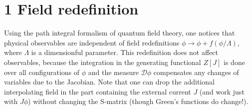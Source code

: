 \documentclass[prd,%
,superscriptaddress,%
nofootinbib,%
tightenlines ]{revtex4}
\begin{document}
\section*{1 Field redefinition \hspace{-2cm}} 
\noindent
Using the path integral formalism of quantum field theory, one notices that physical observables are independent of field redefinitions 
$\phi\rightarrow\phi+f(\phi/\Lambda)$, where $\Lambda$ is a dimensionful parameter. This redefinition does not affect observables, because the integration in the generating functional $Z[J]$ is done over all configurations of $\phi$ and the measure $\mathcal{D}\phi$ compensates any changes of variables due to the Jacobian.  Note that one can drop the additional interpolating field in the part containing the external current $J$ (and work just with $J\phi$) without changing the S-matrix (though Green's functions do change!).
\end{document}
